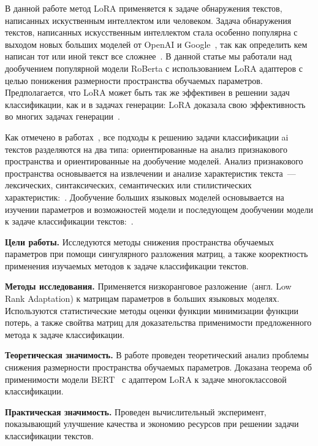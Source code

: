     В данной работе метод LoRA применяется к задаче обнаружения текстов, написанных искуственным интеллектом или человеком.
    Задача обнаружения текстов, написанных искусственным интеллектом стала особенно популярна с выходом новых больших моделей от OpenAI и Google~\cite{OpenAI, Google}, так как определить кем написан тот или иной текст все сложнее~\cite{anderson2023ai, weber2023testing}. В данной статье мы работали над дообучением популярной модели RoBerta с использованием LoRA адаптеров с целью понижения размерности пространства обучаемых параметров. Предполагается, что LoRA может быть так же эффективен в решении задач классификации, как и в задачах генерации: LoRA доказала свою эффективность во многих задачах генерации~\cite{dettmers2024qlora,hu2021lora,dai2024instructblip}.

Как отмечено в работах~\cite{he2023mgtbench,abdali2024decoding}, все подходы к решению задачи классификации ai текстов разделяются на два типа: ориентированные на анализ признакового пространства и ориентированные на дообучение моделей. 
 Анализ признакового пространства основывается на извлечении и анализе характеристик текста~--- лексических, синтаксических, семантических или стилистических характеристик:~\cite{liang2023gpt,yu2023gpt,yang2023dna}.
 Дообучение больших языковых моделей основывается на изучении параметров и возможностей модели и последующем дообучении модели к задаче классификации текстов:~\cite{wolf2019huggingface,wolf2019huggingface,qasim2022fine}.


\textbf{Цели работы.}
Исследуются методы снижения пространства обучаемых параметров при помощи сингулярного разложения матриц, а также кооректность применения изучаемых методов к задаче классификации текстов. 

\textbf{Методы исследования.}
Применяется низкоранговое разложение~(англ. Low Rank Adaptation) к матрицам параметров в больших языковых моделях. Используются статистические методы оценки функции минимизации функции потерь, а также свойтва матриц для доказательства применимости предложенного метода к задаче классификации.

\textbf{Теоретическая значимость.}
В работе проведен теоретический анализ проблемы снижения размерности пространства обучаемых параметров. Доказана теорема об применимости модели BERT~\cite{vaswani2017attention} с адаптером LoRA к задаче многоклассовой классификации. 

\textbf{Практическая значимость.}
Проведен вычислительный эксперимент, показывающий улучшение качества и экономию ресурсов при решении задачи классификации текстов.